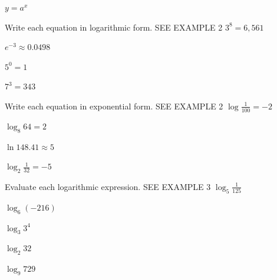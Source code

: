 \documentclass{article}
\newenvironment{practice}[2]{}{}
\begin{document}
\begin{practice}{23}{?}
$y = a^x$
\end{practice}

Write each equation in logarithmic form. SEE EXAMPLE 2
\begin{practice}{24}{?}
$3^8 = 6,561$
\end{practice}

\begin{practice}{25}{?}
$e^{-3} \approx 0.0498$
\end{practice}

\begin{practice}{26}{?}
$5^0 = 1$
\end{practice}

\begin{practice}{27}{?}
$7^3 = 343$
\end{practice}

Write each equation in exponential form. SEE EXAMPLE 2
\begin{practice}{28}{?}
$\log \frac{1}{100} = -2$
\end{practice}

\begin{practice}{29}{?}
$\log_8 64 = 2$
\end{practice}

\begin{practice}{30}{?}
$\ln 148.41 \approx 5$
\end{practice}

\begin{practice}{31}{?}
$\log_2 \frac{1}{32} = -5$
\end{practice}

Evaluate each logarithmic expression. SEE EXAMPLE 3
\begin{practice}{32}{?}
$\log_5 \frac{1}{125}$
\end{practice}

\begin{practice}{33}{?}
$\log_6 (-216)$
\end{practice}

\begin{practice}{34}{?}
$\log_3 3^4$
\end{practice}

\begin{practice}{35}{?}
$\log_2 32$
\end{practice}

\begin{practice}{36}{?}
$\log_9 729$
\end{practice}
\end{document}

